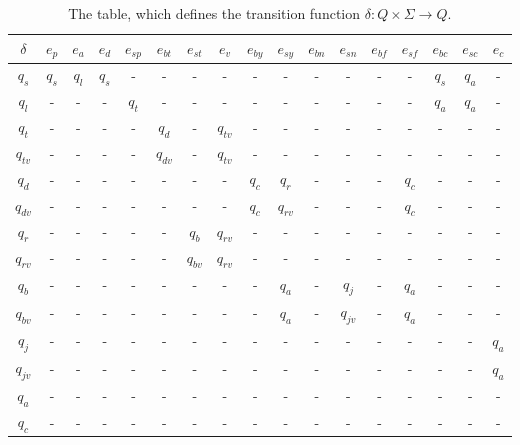 \begin{table}[H]
\begin{center}
\begin{tabular}{ c|c c c c c c c c c c c c c c c c} 
 $\delta$ & $e_{p}$ & $e_{a}$ & $e_{d}$ & $e_{sp}$ & $e_{bt}$ & $e_{st}$ & $e_{v}$ & $e_{by}$ & $e_{sy}$ & $e_{bn}$ & $e_{sn}$ & $e_{bf}$ & $e_{sf}$ & $e_{bc}$ & $e_{sc}$ & $e_{c}$\\ 
 \hline
$\boxed{q_{s}}$ & $q_{s}$ & $q_{l}$ & $q_{s}$ & - & - & - & - & - & - & - & - & - & - & $q_{s}$ & \underline{$q_{a}$} & -\\ 
 $q_{l}$ & - & - & - & $q_{t}$ & - & - & - & - & - & - & - & - & - & \underline{$q_{a}$} & \underline{$q_{a}$} & -  \\ 
 $q_{t}$ & - & - & - & - & $q_{d}$ & - & $q_{tv}$ & - & - & - & - & - & - & - & - & -  \\
 $q_{tv}$ & - & - & - & - & $q_{dv}$ & - & $q_{tv}$ & - & - & - & - & - & - & - & - & -  \\ 
 $q_{d}$ & - & - & - & - & - & - & - & \underline{$q_{c}$} & $q_{r}$ & - & - & - & $q_{c}$ & - & - & -  \\
 $q_{dv}$ & - & - & - & - & - & - & - & \underline{$q_{c}$} & $q_{rv}$ & - & - & - & $q_{c}$ & - & - & -  \\  
 $q_{r}$ & - & - & - & - & - & $q_{b}$ & $q_{rv}$ & - & - & - & - & - & - & - & - & -  \\ 
 $q_{rv}$ & - & - & - & - & - & $q_{bv}$ & $q_{rv}$ & - & - & - & - & - & - & - & - & -  \\ 
 $q_{b}$ & - & - & - & - & - & - & - & - & \underline{$q_{a}$} & - & $q_{j}$ & - & \underline{$q_{a}$} & - & - & -  \\ 
 $q_{bv}$ & - & - & - & - & - & - & - & - & \underline{$q_{a}$} & - & $q_{jv}$ & - & \underline{$q_{a}$} & - & - & - \\ 
 $q_{j}$ & - & - & - & - & - & - & - & - & - & - & - & - & - & - & - & \underline{$q_{a}$}  \\ 
 $q_{jv}$ & - & - & - & - & - & - & - & - & - & - & - & - & - & - & - & \underline{$q_{a}$}  \\ 
 \underline{$q_{a}$} & - & - & - & - & - & - & - & - & - & - & - & - & - & - & - & -  \\ 
 \underline{$q_{c}$} & - & - & - & - & - & - & - & - & - & - & - & - & - & - & - & - \\ 
 \end{tabular}
 \caption {The table, which defines the transition function $\delta: Q \times \Sigma \rightarrow Q$. }
 \label{tab:deltafunction}
\end{center}
\end{table}

